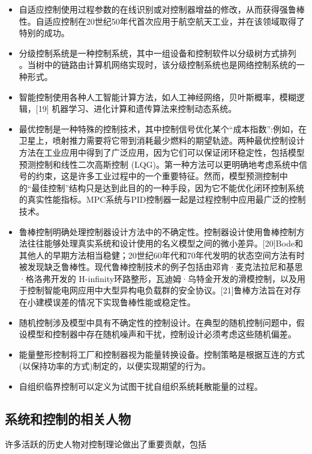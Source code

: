 \begin{itemize}
\item 自适应控制使用过程参数的在线识别或对控制器增益的修改，从而获得强鲁棒性。自适应控制在20世纪50年代首次应用于航空航天工业，并在该领域取得了特别的成功。
\item 分级控制系统是一种控制系统，其中一组设备和控制软件以分级树方式排列 。当树中的链路由计算机网络实现时，该分级控制系统也是网络控制系统的一种形式。
\item 智能控制使用各种人工智能计算方法，如人工神经网络，贝叶斯概率，模糊逻辑，[19] 机器学习、进化计算和遗传算法来控制动态系统。
\item 最优控制是一种特殊的控制技术，其中控制信号优化某个“成本指数”:例如，在卫星上，喷射推力需要将它带到消耗最少燃料的期望轨迹。两种最优控制设计方法在工业应用中得到了广泛应用，因为它们可以保证闭环稳定性，包括模型预测控制和线性二次高斯控制 (LQG)。第一种方法可以更明确地考虑系统中信号的约束，这是许多工业过程中的一个重要特征。然而，模型预测控制中的“最佳控制”结构只是达到此目的的一种手段，因为它不能优化闭环控制系统的真实性能指标。MPC系统与PID控制器一起是过程控制中应用最广泛的控制技术。
\item 鲁棒控制明确处理控制器设计方法中的不确定性。控制器设计使用鲁棒控制方法往往能够处理真实系统和设计使用的名义模型之间的微小差异。[20]Bode和其他人的早期方法相当稳健；20世纪60年代和70年代发明的状态空间方法有时被发现缺乏鲁棒性。现代鲁棒控制技术的例子包括由邓肯·麦克法拉尼和基思·格洛弗开发的 H-infinity环路整形，瓦迪姆·乌特金开发的滑模控制，以及用于控制智能电网应用中大型异构电负载群的安全协议。[21]鲁棒方法旨在对存在小建模误差的情况下实现鲁棒性能或稳定性。
\item 随机控制涉及模型中具有不确定性的控制设计。在典型的随机控制问题中，假设模型和控制器中存在随机噪声和干扰，控制设计必须考虑这些随机偏差。
\item 能量整形控制将工厂和控制器视为能量转换设备。控制策略是根据互连的方式(以保持功率的方式)制定的，以便实现期望的行为。
\item 自组织临界控制可以定义为试图干扰自组织系统耗散能量的过程。
\end{itemize}


\subsection{系统和控制的相关人物}

许多活跃的历史人物对控制理论做出了重要贡献，包括

